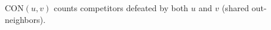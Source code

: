\documentclass[preview]{standalone}
\begin{document}
$\text{CON}(u, v)$ counts competitors defeated by both $u$ and $v$ (shared out-neighbors).\\
\end{document}
